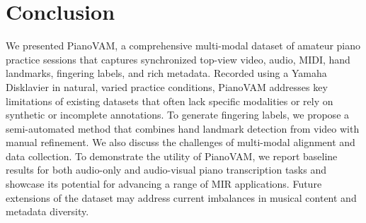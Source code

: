 \documentclass{article}
\begin{document}
\section{Conclusion}\label{sec:conclusion}
We presented PianoVAM, a comprehensive multi-modal dataset of amateur piano practice sessions that captures synchronized top-view video, audio, MIDI, hand landmarks, fingering labels, and rich metadata. Recorded using a Yamaha Disklavier in natural, varied practice conditions, PianoVAM addresses key limitations of existing datasets that often lack specific modalities or rely on synthetic or incomplete annotations. To generate fingering labels, we propose a semi-automated method that combines hand landmark detection from video with manual refinement. We also discuss the challenges of multi-modal alignment and data collection. To demonstrate the utility of PianoVAM, we report baseline results for both audio-only and audio-visual piano transcription tasks and showcase its potential for advancing a range of MIR applications. Future extensions of the dataset may address current imbalances in musical content and metadata diversity.
 
\end{document}
